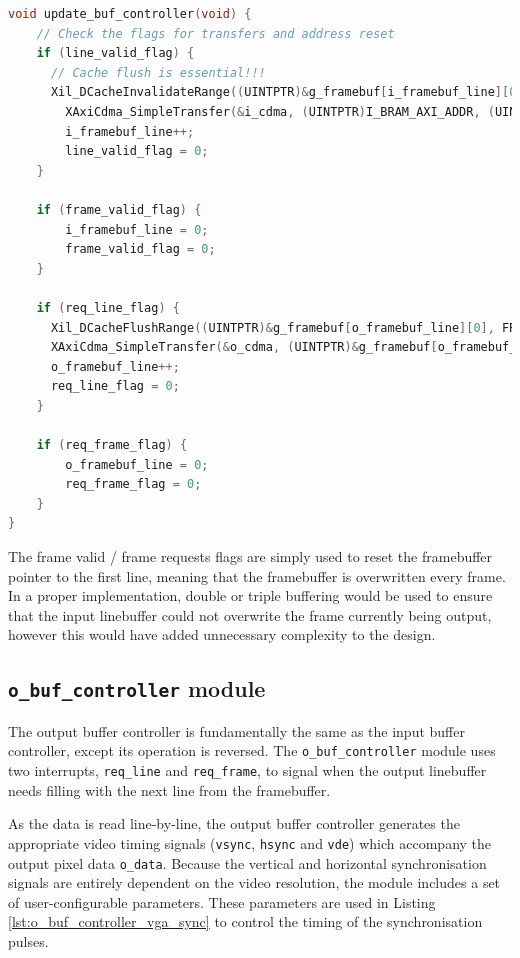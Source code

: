 \begin{lstlisting}[caption={Buffer controller update loop}, label={lst:update_buf_controller}, language=C]
void update_buf_controller(void) {
    // Check the flags for transfers and address reset
    if (line_valid_flag) {
      // Cache flush is essential!!!
      Xil_DCacheInvalidateRange((UINTPTR)&g_framebuf[i_framebuf_line][0], FRAMEBUF_WIDTH);
        XAxiCdma_SimpleTransfer(&i_cdma, (UINTPTR)I_BRAM_AXI_ADDR, (UINTPTR)&g_framebuf[i_framebuf_line][0], FRAMEBUF_WIDTH, NULL, NULL);
        i_framebuf_line++;
        line_valid_flag = 0;
    }

    if (frame_valid_flag) {
        i_framebuf_line = 0;
        frame_valid_flag = 0;
    }

    if (req_line_flag) {
      Xil_DCacheFlushRange((UINTPTR)&g_framebuf[o_framebuf_line][0], FRAMEBUF_WIDTH);
      XAxiCdma_SimpleTransfer(&o_cdma, (UINTPTR)&g_framebuf[o_framebuf_line][0], (UINTPTR)O_BRAM_AXI_ADDR, FRAMEBUF_WIDTH, NULL, NULL);
      o_framebuf_line++;
      req_line_flag = 0;
    }

    if (req_frame_flag) {
        o_framebuf_line = 0;
        req_frame_flag = 0;
    }
} 
\end{lstlisting}

The frame valid / frame requests flags are simply used to reset the framebuffer pointer to the first line, meaning that the framebuffer is overwritten every frame. In a proper implementation, double or triple buffering would be used to ensure that the input linebuffer could not overwrite the frame currently being output, however this would have added unnecessary complexity to the design.




\subsection{\texttt{o\_buf\_controller} module}
The output buffer controller is fundamentally the same as the input buffer controller, except its operation is reversed. The \texttt{o\_buf\_controller} module uses two interrupts, \texttt{req\_line} and \texttt{req\_frame}, to signal when the output linebuffer needs filling with the next line from the framebuffer.

As the data is read line-by-line, the output buffer controller generates the appropriate video timing signals (\texttt{vsync}, \texttt{hsync} and \texttt{vde}) which accompany the output pixel data \texttt{o\_data}. Because the vertical and horizontal synchronisation signals are entirely dependent on the video resolution, the module includes a set of user-configurable parameters. These parameters are used in Listing \ref{lst:o_buf_controller_vga_sync} to control the timing of the synchronisation pulses.

